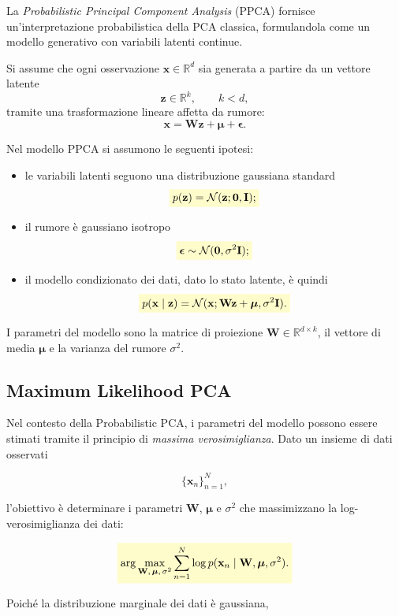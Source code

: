 \documentclass[a4paper,12pt]{report}
\newcommand{\highlight}[1]{%
\colorbox{yellow!20}{$\displaystyle #1$}%
}
\begin{document}
La \emph{Probabilistic Principal Component Analysis} (PPCA) fornisce un'interpretazione probabilistica della PCA classica, formulandola come un modello generativo con variabili latenti continue.

Si assume che ogni osservazione $\mathbf{x} \in \mathbb{R}^d$ sia generata a partire da un vettore latente
\[
\mathbf{z} \in \mathbb{R}^k, \qquad k < d,
\]
tramite una trasformazione lineare affetta da rumore:
\[
\mathbf{x} = \mathbf{W}\mathbf{z} + \boldsymbol{\mu} + \boldsymbol{\epsilon}.
\]

Nel modello PPCA si assumono le seguenti ipotesi:
\begin{itemize}
    \item le variabili latenti seguono una distribuzione gaussiana standard
    \[
    \highlight{
    p(\mathbf{z}) = \mathcal{N}(\mathbf{z}; \mathbf{0}, \mathbf{I});}
    \]
    \item il rumore è gaussiano isotropo
    \[
    \highlight{
    \boldsymbol{\epsilon} \sim \mathcal{N}(\mathbf{0}, \sigma^2 \mathbf{I});}
    \]
    \item il modello condizionato dei dati, dato lo stato latente, è quindi
    \[
    \highlight{
    p(\mathbf{x} \mid \mathbf{z}) = \mathcal{N}(\mathbf{x}; \mathbf{W}\mathbf{z} + \boldsymbol{\mu}, \sigma^2 \mathbf{I}).}
    \]
\end{itemize}

I parametri del modello sono la matrice di proiezione $\mathbf{W} \in \mathbb{R}^{d \times k}$, 
il vettore di media $\boldsymbol{\mu}$ e la varianza del rumore $\sigma^2$.

\subsection{Maximum Likelihood PCA}

Nel contesto della Probabilistic PCA, i parametri del modello possono essere stimati tramite il principio di \emph{massima verosimiglianza}. Dato un insieme di dati osservati

\[
\{\mathbf{x}_n\}_{n=1}^{N},
\]

l'obiettivo è determinare i parametri $\mathbf{W}$, $\boldsymbol{\mu}$ e $\sigma^2$ che massimizzano la log-verosimiglianza dei dati:

\[
\highlight{
\arg \max_{\mathbf{W},\,\boldsymbol{\mu},\,\sigma^2}
\sum_{n=1}^{N} \log p(\mathbf{x}_n \mid \mathbf{W}, \boldsymbol{\mu}, \sigma^2).}
\]

Poiché la distribuzione marginale dei dati è gaussiana,
\end{document}

